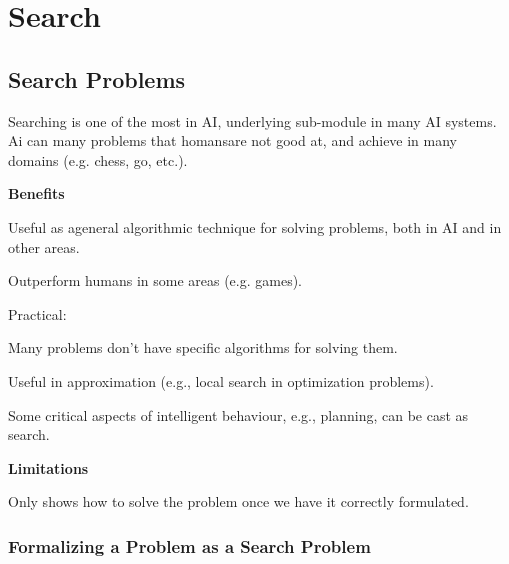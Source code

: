 \chapter{Search}

\section{Search Problems}

Searching is one of the most  in AI, underlying sub-module in many AI systems. Ai can  many problems that homansare not good at, and achieve  in many domains (e.g. chess, go, etc.).

\begin{listu}
    \item \textbf{Benefits}

    \begin{listu}
        \item Useful as ageneral algorithmic technique for solving problems, both in AI and in other areas.

        \item Outperform humans in some areas (e.g. games).

        \item Practical:

        \begin{listu}
            \item Many problems don't have specific algorithms for solving them.
            \item Useful in approximation (e.g., local search in optimization problems).
        \end{listu}

        \item Some critical aspects of intelligent behaviour, e.g., planning, can be cast as search.
    \end{listu}

    \item \textbf{Limitations}

    \begin{listu}
        \item Only shows how to solve the problem once we have it correctly formulated.
    \end{listu}
\end{listu}


\subsection{Formalizing a Problem as a Search Problem}

